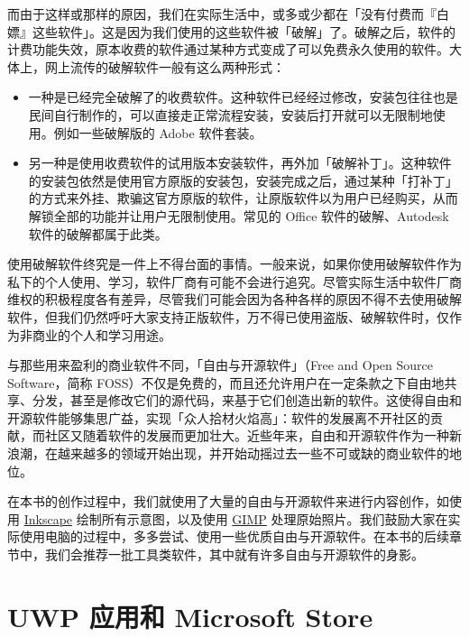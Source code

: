 {{而由于这样或那样的原因，我们在实际生活中，或多或少都在「没有付费而『白嫖』这些软件」。这是因为我们使用的这些软件被「破解」了。破解之后，软件的计费功能失效，原本收费的软件通过某种方式变成了可以免费永久使用的软件。大体上，网上流传的破解软件一般有这么两种形式：

\begin{itemize}
  \item 一种是已经完全破解了的收费软件。这种软件已经经过修改，安装包往往也是民间自行制作的，可以直接走正常流程安装，安装后打开就可以无限制地使用。例如一些破解版的 Adobe 软件套装。
\end{itemize}

\begin{itemize}
  \item 另一种是使用收费软件的试用版本安装软件，再外加「破解补丁」。这种软件的安装包依然是使用官方原版的安装包，安装完成之后，通过某种「打补丁」的方式来外挂、欺骗这官方原版的软件，让原版软件以为用户已经购买，从而解锁全部的功能并让用户无限制使用。常见的 Office 软件的破解、Autodesk 软件的破解都属于此类。
\end{itemize}

使用破解软件终究是一件上不得台面的事情。一般来说，如果你使用破解软件作为私下的个人使用、学习，软件厂商有可能不会进行追究。尽管实际生活中软件厂商维权的积极程度各有差异，尽管我们可能会因为各种各样的原因不得不去使用破解软件，但我们仍然呼吁大家支持正版软件，万不得已使用盗版、破解软件时，仅作为非商业的个人和学习用途。

与那些用来盈利的商业软件不同，「自由与开源软件」（Free and Open Source Software，简称 FOSS）不仅是免费的，而且还允许用户在一定条款之下自由地共享、分发，甚至是修改它们的源代码，来基于它们创造出新的软件。这使得自由和开源软件能够集思广益，实现「众人拾材火焰高」：软件的发展离不开社区的贡献，而社区又随着软件的发展而更加壮大。近些年来，自由和开源软件作为一种新浪潮，在越来越多的领域开始出现，并开始动摇过去一些不可或缺的商业软件的地位。

在本书的创作过程中，我们就使用了大量的自由与开源软件来进行内容创作，如使用 \href{https://inkscape.org/}{Inkscape} 绘制所有示意图，以及使用 \href{https://www.gimp.org/}{GIMP} 处理原始照片。我们鼓励大家在实际使用电脑的过程中，多多尝试、使用一些优质自由与开源软件。在本书的后续章节中，我们会推荐一批工具类软件，其中就有许多自由与开源软件的身影。

\section{UWP 应用和 Microsoft Store}

}}
